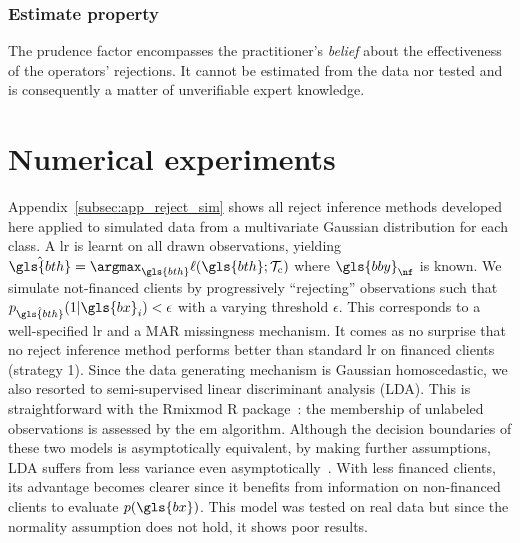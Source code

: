 \subsubsection{Estimate property}

The prudence factor encompasses the practitioner's \textit{belief} about the effectiveness of the operators' rejections. It cannot be estimated from the data nor tested and is consequently a matter of unverifiable expert knowledge.

%

\section{Numerical experiments} \label{sec:num_exp_reject}

Appendix~\ref{subsec:app_reject_sim} shows all reject inference methods developed here applied to simulated data from a multivariate Gaussian distribution for each class. A \gls{lr} is learnt on all drawn observations, yielding $\hat{\gls{bth}} = \argmax_{\gls{bth}} \ell(\gls{bth}; \mathcal{T}_{\text{c}})$ where $\gls{bby}_{\nf}$ is known. We simulate not-financed clients by progressively ``rejecting'' observations such that $p_{\hat{\gls{bth}}}(1 | \gls{bx}_i) < \epsilon$ with a varying threshold $\epsilon$. This corresponds to a well-specified \gls{lr} and a MAR missingness mechanism. It comes as no surprise that no reject inference method performs better than standard \gls{lr} on financed clients (strategy 1). Since the data generating mechanism is Gaussian homoscedastic, we also resorted to semi-supervised linear discriminant analysis (LDA). This is straightforward with the Rmixmod \textsf{R} package~\cite{lebret2014rmixmod}: the membership of unlabeled observations is assessed by the \gls{em} algorithm. Although the decision boundaries of these two models is asymptotically equivalent, by making further assumptions, LDA suffers from less variance even asymptotically~\cite{efron1975efficiency}. With less financed clients, its advantage becomes clearer since it benefits from information on non-financed clients to evaluate $p(\gls{bx})$. This model was tested on real data but since the normality assumption does not hold, it shows poor results.

